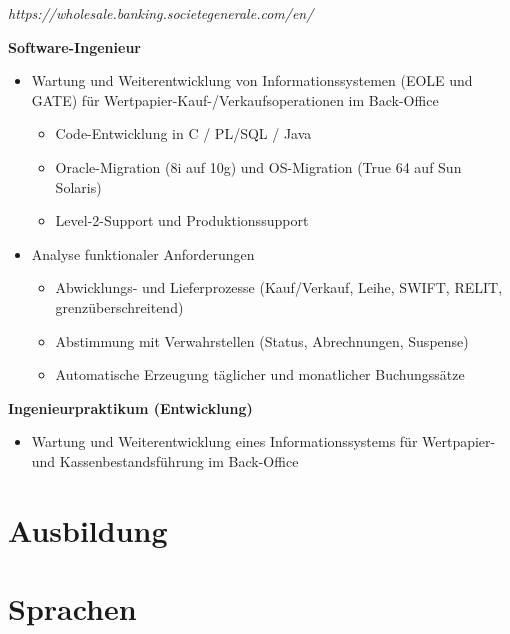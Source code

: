 \documentclass[11pt,a4paper]{moderncv}
\begin{document}
\newpage

{
	\textit{https://wholesale.banking.societegenerale.com/en/}

	\bigskip
	\textbf{Software-Ingenieur}
\bigskip
\begin{itemize}
\item Wartung und Weiterentwicklung von Informationssystemen (EOLE und GATE) für Wertpapier-Kauf-/Verkaufsoperationen im Back-Office
	\begin{itemize}
		\item Code-Entwicklung in C / PL/SQL / Java
		\item Oracle-Migration (8i auf 10g) und OS-Migration (True 64 auf Sun Solaris)
		\item Level-2-Support und Produktionssupport
\end{itemize}
\bigskip
\item Analyse funktionaler Anforderungen
	\begin{itemize}
		\item Abwicklungs- und Lieferprozesse (Kauf/Verkauf, Leihe, SWIFT, RELIT, grenzüberschreitend)
		\item Abstimmung mit Verwahrstellen (Status, Abrechnungen, Suspense)
		\item Automatische Erzeugung täglicher und monatlicher Buchungssätze
	\end{itemize}
\end{itemize}
}
\bigskip
{}
{
\bigskip
\textbf{Ingenieurpraktikum (Entwicklung)}
\bigskip
\begin{itemize}
	\item Wartung und Weiterentwicklung eines Informationssystems für Wertpapier- und Kassenbestandsführung im Back-Office
\end{itemize}
}
\section{Ausbildung}



\section{Sprachen}
\end{document}
